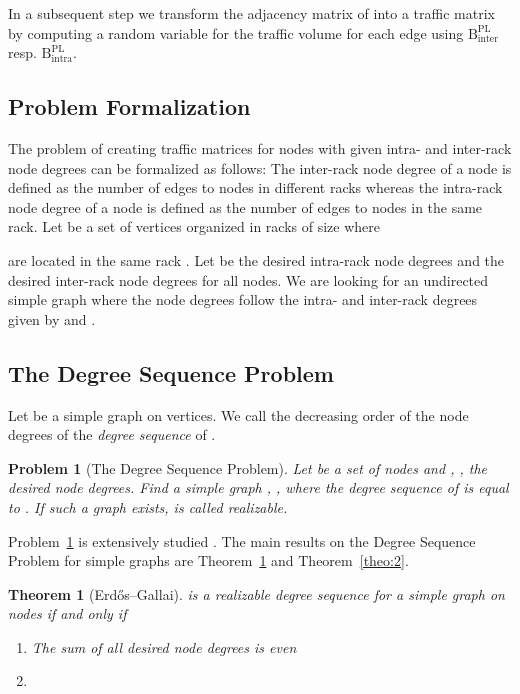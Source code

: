 \documentclass[journal,10pt]{IEEEtran}
\newtheorem{theorem}{Theorem}
\newtheorem{problem}{Problem}
\newcommand{\bytes}[2]{\ensuremath{\mathrm{B}^{\mathrm{#1}}_{\mathrm{#2}}}}
\begin{document}
		In a subsequent step we transform the adjacency matrix of  into a traffic matrix by computing a random variable for the traffic volume 
		for each edge using \bytes{PL}{inter} resp. \bytes{PL}{intra}.

		
	\subsection{Problem Formalization}
		The problem of creating traffic matrices for  nodes with given intra- and inter-rack node degrees 
		can be formalized as follows:
		The inter-rack node degree of a node is defined as the number of edges to nodes in different racks
		whereas the intra-rack node degree of a node is defined as the number of edges to nodes in the same rack.
		Let  be a set of vertices organized in racks of size  where
		 
		 		
		are located in the same rack .
		Let  be the desired intra-rack node degrees and
		 the desired inter-rack node degrees for all  nodes.
		We are looking for an undirected simple graph  where the node degrees follow the intra- and inter-rack 
		degrees given by  and .
	\subsection{The Degree Sequence Problem}
		\label{sec:GraphsWithDegs}
		Let  be a simple graph on  vertices.
		We call the decreasing order of the node degrees of  the \emph{degree sequence} of .
		\begin{problem}[The Degree Sequence Problem]
		\label{prob:DegSeqProb}
		Let  be a set of nodes and ,   , the desired node degrees.
		Find a simple 
		graph
		, , where the degree sequence of  is equal to .
		If such a graph exists,  is called \emph{realizable}.
		\end{problem}
		
		Problem~\ref{prob:DegSeqProb} is extensively studied \cite{hakimi62, havel55}.
		The main results on the Degree Sequence Problem for simple graphs are Theorem~\ref{theo:1} and Theorem~\ref{theo:2}.
		
		\begin{theorem}[Erdős–Gallai]
			 is a realizable degree sequence for a simple graph on  nodes if and only if
			\begin{enumerate}
				\item The sum of all desired node degrees is even
				\item   
			\end{enumerate}
			\label{theo:1}
		\end{theorem}
\end{document}
